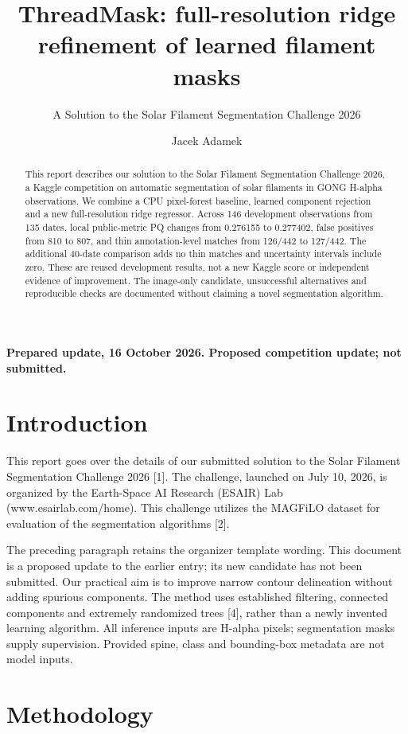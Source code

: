 \documentclass[sigconf]{acmart}
\begin{document}
\title{ThreadMask: full-resolution ridge refinement of learned filament masks}
\subtitle{A Solution to the Solar Filament Segmentation Challenge 2026}
\author{Jacek Adamek}
\begin{abstract}
This report describes our solution to the Solar Filament Segmentation Challenge 2026, a Kaggle competition on automatic segmentation of solar filaments in GONG H-alpha observations. We combine a CPU pixel-forest baseline, learned component rejection and a new full-resolution ridge regressor. Across 146 development observations from 135 dates, local public-metric PQ changes from 0.276155 to 0.277402, false positives from 810 to 807, and thin annotation-level matches from 126/442 to 127/442. The additional 40-date comparison adds no thin matches and uncertainty intervals include zero. These are reused development results, not a new Kaggle score or independent evidence of improvement. The image-only candidate, unsuccessful alternatives and reproducible checks are documented without claiming a novel segmentation algorithm.
\end{abstract}
\maketitle
\noindent\textbf{Prepared update, 16 October 2026. Proposed competition update; not submitted.}
\section{Introduction}
This report goes over the details of our submitted solution to the Solar Filament Segmentation Challenge 2026 [1]. The challenge, launched on July 10, 2026, is organized by the Earth-Space AI Research (ESAIR) Lab (www.esairlab.com/home). This challenge utilizes the MAGFiLO dataset for evaluation of the segmentation algorithms [2].

The preceding paragraph retains the organizer template wording. This document is a proposed update to the earlier entry; its new candidate has not been submitted. Our practical aim is to improve narrow contour delineation without adding spurious components. The method uses established filtering, connected components and extremely randomized trees [4], rather than a newly invented learning algorithm. All inference inputs are H-alpha pixels; segmentation masks supply supervision. Provided spine, class and bounding-box metadata are not model inputs.
\section{Methodology}
\end{document}
